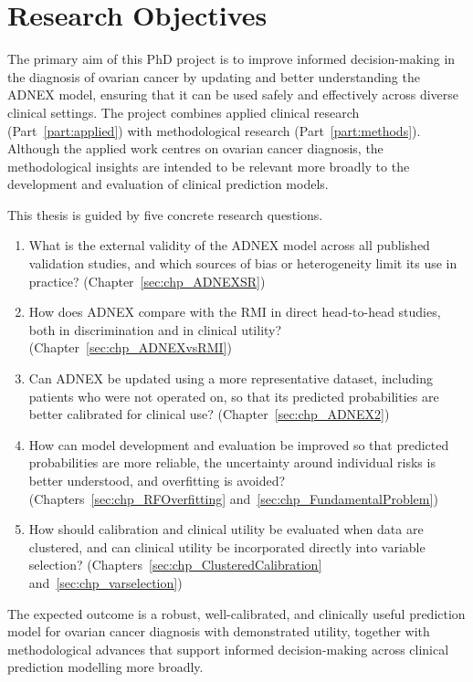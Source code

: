 \chapter{Research Objectives}
\label{sec:research_objectives}

The primary aim of this PhD project is to improve informed decision-making in the diagnosis of ovarian cancer by updating and better understanding the \gls{ADNEX} model, ensuring that it can be used safely and effectively across diverse clinical settings. The project combines applied clinical research (Part~\ref{part:applied}) with methodological research (Part~\ref{part:methods}). Although the applied work centres on ovarian cancer diagnosis, the methodological insights are intended to be relevant more broadly to the development and evaluation of clinical prediction models.

This thesis is guided by five concrete research questions.

\begin{enumerate}
	\item What is the external validity of the \gls{ADNEX} model across all published validation studies, and which sources of bias or heterogeneity limit its use in practice? (Chapter~\ref{sec:chp_ADNEXSR})
	\item How does \gls{ADNEX} compare with the \gls{RMI} in direct head-to-head studies, both in discrimination and in clinical utility? (Chapter~\ref{sec:chp_ADNEXvsRMI})
	\item Can \gls{ADNEX} be updated using a more representative dataset, including patients who were not operated on, so that its predicted probabilities are better calibrated for clinical use? (Chapter~\ref{sec:chp_ADNEX2})
	\item How can model development and evaluation be improved so that predicted probabilities are more reliable, the uncertainty around individual risks is better understood, and overfitting is avoided? (Chapters~\ref{sec:chp_RFOverfitting} and~\ref{sec:chp_FundamentalProblem})
	\item How should calibration and clinical utility be evaluated when data are clustered, and can clinical utility be incorporated directly into variable selection? (Chapters~\ref{sec:chp_ClusteredCalibration} and~\ref{sec:chp_varselection})
\end{enumerate}

The expected outcome is a robust, well-calibrated, and clinically useful prediction model for ovarian cancer diagnosis with demonstrated utility, together with methodological advances that support informed decision-making across clinical prediction modelling more broadly.
